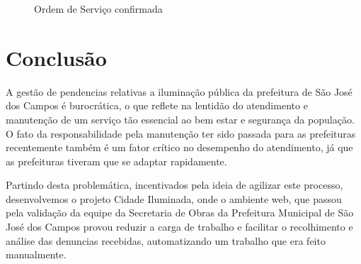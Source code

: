 \documentclass[
	article,			%
	11pt,				%
	oneside,			%
	a4paper,			%
	english,			%
	brazil,				%
	sumario=tradicional
	]{abntex2}
\begin{document}
\begin{figure}[!htbp]
 \centering
 \caption{\label{site-os-confirmada}Ordem de Serviço confirmada}
\end{figure}

\clearpage

%

\section{Conclusão}

A gestão de pendencias relativas a iluminação pública da prefeitura de São José dos Campos é burocrática, o que reflete na lentidão do atendimento e manutenção de um serviço tão essencial ao bem estar e segurança da população.
O fato da responsabilidade pela manutenção ter sido passada para as prefeituras recentemente também é um fator crítico no desempenho do atendimento, já que as prefeituras tiveram que se adaptar rapidamente.

Partindo desta problemática, incentivados pela ideia de agilizar este processo, desenvolvemos o projeto Cidade Iluminada, onde o ambiente web, que passou pela validação da equipe da Secretaria de Obras da Prefeitura Municipal de São José dos Campos provou reduzir a carga de trabalho e facilitar o recolhimento e análise das denuncias recebidas, automatizando um trabalho que era feito manualmente.
\end{document}
